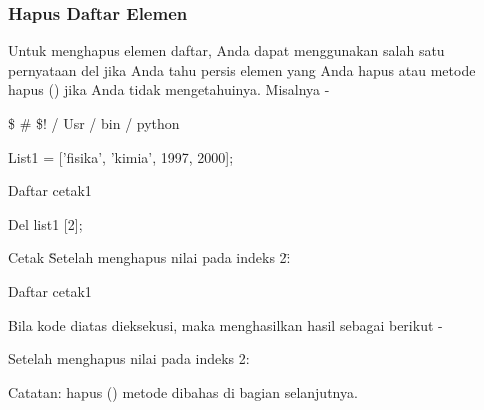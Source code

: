 \subsubsection{Hapus Daftar Elemen}
\vspace{12pt}
Untuk menghapus elemen daftar, Anda dapat menggunakan salah satu pernyataan del jika Anda tahu persis elemen yang Anda hapus atau metode hapus () jika Anda tidak mengetahuinya. Misalnya - \par
\vspace{12pt}
 \$  \#  \$! / Usr / bin / python \par
\vspace{12pt}
List1 = ['fisika', 'kimia', 1997, 2000]; \par
\vspace{12pt}
Daftar cetak1 \par
\vspace{12pt}
Del list1 [2]; \par
\vspace{12pt}
Cetak \"Setelah menghapus nilai pada indeks 2:\" \par
\vspace{12pt}
Daftar cetak1 \par
Bila kode diatas dieksekusi, maka menghasilkan hasil sebagai berikut - \par
['Fisika', 'kimia', 1997, 2000] \par
Setelah menghapus nilai pada indeks 2: \par
['Fisika', 'kimia', 2000] \par
Catatan: hapus () metode dibahas di bagian selanjutnya. \par
